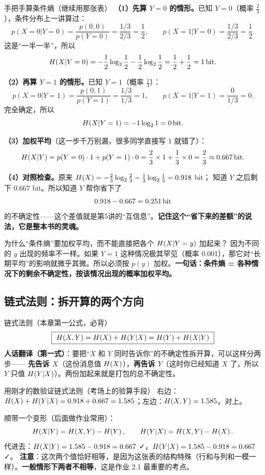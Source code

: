 \begin{calc}{手把手算条件熵（继续用那张表）}
\textbf{（1）先算 $Y=0$ 的情形。}已知 $Y=0$（概率 $\frac23$），条件分布上一讲算过：
\[
p(X=0|Y=0)=\frac{p(0,0)}{p(Y=0)}=\frac{1/3}{2/3}=\frac12,\qquad
p(X=1|Y=0)=\frac{1/3}{2/3}=\frac12 .
\]
这是“一半一半”，所以
\[
H\!\left(X|Y=0\right)=-\frac12\log_{2}\frac12-\frac12\log_{2}\frac12=\frac12+\frac12=1\,\text{bit} .
\]

\textbf{（2）再算 $Y=1$ 的情形。}已知 $Y=1$（概率 $\frac13$）：
\[
p(X=0|Y=1)=\frac{p(0,1)}{p(Y=1)}=\frac{1/3}{1/3}=1,\qquad
p(X=1|Y=1)=\frac{0}{1/3}=0 .
\]
完全确定，所以
\[
H\!\left(X|Y=1\right)=-1\log_{2}1=0\,\text{bit} .
\]

\textbf{（3）加权平均}（这一步千万别漏，很多同学直接写 $1$ 就错了）：
\[
H\!\left(X|Y\right)=p(Y=0)\cdot1+p(Y=1)\cdot0
=\frac23\times1+\frac13\times0=\frac23\approx0.667\,\text{bit} .
\]

\textbf{（4）对照检查。}原来 $H\!\left(X\right)=-\frac23\log_{2}\frac23-\frac13\log_{2}\frac13=0.918$ bit；
知道 $Y$ 之后剩下 $0.667$ bit。所以知道 $Y$ 帮你省下了
\[
0.918-0.667=0.251\,\text{bit}
\]
的不确定性——这个差值就是第5讲的“互信息”。\textbf{记住这个“省下来的差额”的说法，它是整本书的灵魂。}
\end{calc}

\begin{qa}{为什么“条件熵”要加权平均，而不能直接把各个 $H\!\left(X|Y=y\right)$ 加起来？}
因为不同的 $y$ 出现的频率不一样。如果 $Y=1$ 这种情况极其罕见（概率 0.001），那它对“长期平均”的影响就微乎其微。所以必须按 $p(y)$ 加权。\textbf{一句话：条件熵 = 各种情况下的剩余不确定性，按该情况出现的概率加权平均。}
\end{qa}

\subsection{链式法则：拆开算的两个方向}

\begin{defbox}{链式法则（本章第一公式，必背）}
\[
\boxed{\ \Hx{X,Y}=\Hx{X}+\Hx{Y|X}=\Hx{Y}+\Hx{X|Y}\ }
\]
\textbf{人话翻译（第一式）}：要把“$X$ 和 $Y$ 同时告诉你”的不确定性拆开算，可以这样分两步——
\textbf{先告诉 $X$}（这份消息值 $H\!\left(X\right)$），\textbf{再告诉 $Y$}（这时你已经知道 $X$ 了，所以 $Y$ 只值 $H\!\left(Y|X\right)$）。两份加起来就是打包的总不确定性。
\end{defbox}

\begin{calc}{用刚才的数验证链式法则（考场上的验算手段）}
右边：$H\!\left(X\right)+H\!\left(Y|X\right)=0.918+0.667=1.585$；左边：$H\!\left(X,Y\right)=1.585$。对上。

顺带一个变形（后面做作业常用）：
\[
H\!\left(X|Y\right)=H\!\left(X,Y\right)-H\!\left(Y\right),\qquad H\!\left(Y|X\right)=H\!\left(X,Y\right)-H\!\left(X\right).
\]
代进去：$H\!\left(X|Y\right)=1.585-0.918=0.667$ ✓，$H\!\left(Y|X\right)=1.585-0.918=0.667$ ✓。
\textbf{注意}：这次两个值恰好相等，是因为这张表的结构特殊（行和与列和一模一样）。\textbf{一般情形下两者不相等}，这是作业 2.1 最重要的考点。
\end{calc}

